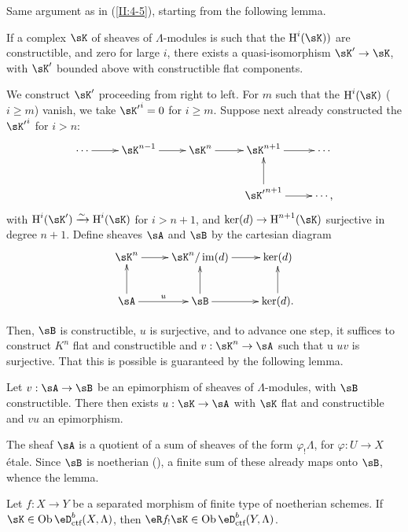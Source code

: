 Same argument as in (\ref{II:4-5}), starting from the following lemma.




\begin{lemma_}\label{II:4-7}
If a complex $\sK$ of sheaves of $\Lambda$-modules is such that the
$\h^i(\sK))$ are constructible, and zero for large $i$, there exists a
quasi-isomorphism $\sK'\to \sK$, with $\sK'$ bounded above with
constructible flat components.
\end{lemma_}

We construct $\sK'$ proceeding from right to left. For $m$ such that the
$\h^i(\sK)$ ($i\geqslant m$) vanish, we take ${\sK'}^i = 0$ for
$i\geqslant m$. Suppose next already constructed the ${\sK'}^i$ for
$i>n$:
\[\xymatrix{
  \cdots \ar[r]
    & \sK^{n-1} \ar[r]
    & \sK^n \ar[r]
    & \sK^{n+1} \ar[r]
    & \cdots \\
  & & & {\sK'}^{n+1} \ar[u] \ar[r]
    & \cdots \text{,}
}\]
with $\h^i(\sK')\iso \h^i(\sK)$ for $i>n+1$, and $\ker(d)\to\h^{n+1}(\sK)$ surjective
in degree $n+1$. Define sheaves $\sA$ and $\sB$ by the cartesian diagram
\[\xymatrix{
  \sK^n \ar[r]
    & \sK^n/\im(d) \ar[r]
    & \ker(d) \\
  \sA \ar[u] \ar[r]^u
    & \sB \ar[u]\ar[r]
    & \ker(d) \ar[u] \text{.}
}\]

Then, $\sB$ is constructible, $u$ is surjective, and to advance one step, it
suffices to construct $K^n$ flat and constructible and $v:\sK^n\to \sA$ such that u
$u v$ is surjective. That this is possible is guaranteed by the following lemma.




\begin{lemma_}\label{II:4-8}
Let $v:\sA\to \sB$ be an epimorphism of sheaves of $\Lambda$-modules, with
$\sB$ constructible. There then exists $u:\sK\to \sA$ with $\sK$ flat and
constructible and $v u$ an epimorphism.
\end{lemma_}

The sheaf $\sA$ is a quotient of a sum of sheaves of the form
$\varphi_! \Lambda$, for $\varphi:U\to X$ \'etale. Since $\sB$ is noetherian
(\cite[IX.2.10]{sga4}), a finite sum of these already maps onto $\sB$,
whence the lemma.




\begin{theorem_}\label{II:4-9}
Let $f:X\to Y$ be a separated morphism of finite type of noetherian schemes.
If $\sK\in\ob\eD_\textnormal{ctf}^b(X,\Lambda)$, then
$\eR f_!\sK\in \ob\eD_\textnormal{ctf}^b(Y,\Lambda)$.
\end{theorem_}

